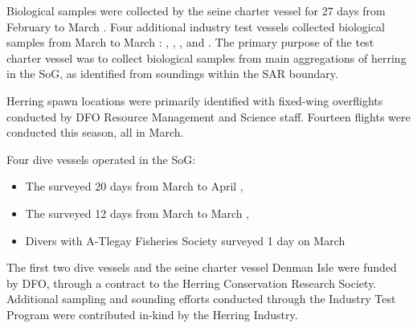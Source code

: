 Biological samples were collected by the seine charter vessel
 for 27 days from February  to March .
Four additional industry test vessels collected biological samples
from March  to March : , ,
, and .
The primary purpose of the test charter vessel was to
collect biological samples from main aggregations of herring in the SoG,
as identified from soundings within the SAR boundary.

Herring spawn locations were primarily identified with
fixed-wing overflights conducted by DFO Resource Management and Science staff.
Fourteen flights were conducted this season, all in March.

Four dive vessels operated in the SoG:

\begin{itemize}

\item The  surveyed 20 days from March  to April ,

\item The  surveyed 12 days from March  to March ,

\item Divers with A-Tlegay Fisheries Society surveyed 1 day on March 

\end{itemize}

The first two dive vessels and the seine charter vessel Denman Isle
were funded by DFO,
through a contract to the Herring Conservation Research Society.
Additional sampling and sounding efforts conducted through the
Industry Test Program were contributed in-kind by the Herring Industry.
